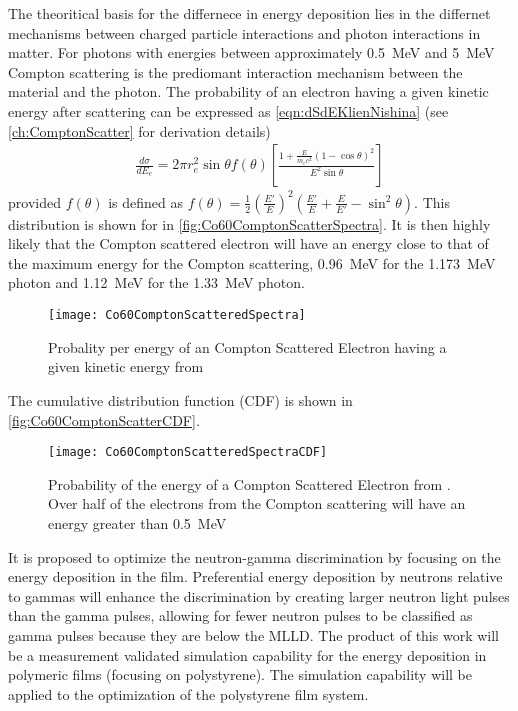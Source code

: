 The theoritical basis for the differnece in energy deposition lies in the differnet mechanisms between charged particle interactions and photon interactions in matter.
For photons with energies between approximately \SI{0.5}{\MeV} and \SI{5}{\MeV} Compton scattering is the prediomant interaction mechanism between the material and the photon.
The probability of an electron having a given kinetic energy after scattering can be expressed as \autoref{eqn:dSdEKlienNishina} (see \autoref{ch:ComptonScatter} for derivation details)
\begin{align}
  \label{eqn:dSdEKleinNishina}
\frac{d\sigma}{dE_e} = 2\pi r_e^2 \sin \theta f(\theta)\left [ \frac{1+\frac{E}{m_e c^2}\left(1-\cos\theta \right)^2}{E^2 \sin \theta} \right ]
\end{align}
provided  $f(\theta)$ is defined as $f(\theta) = \frac{1}{2}\left(\frac{E'}{E}\right)^2 \left(\frac{E'}{E} + \frac{E}{E'}-\sin^2\theta\right)$.
This distribution is shown for  in \autoref{fig:Co60ComptonScatterSpectra}.
It is then highly likely that the Compton scattered electron will have an energy close to that of the maximum energy for the Compton scattering, \SI{0.96}{\MeV} for the \SI{1.173}{\MeV} photon and \SI{1.12}{\MeV} for the \SI{1.33}{\MeV} photon.
\begin{figure}
  \centering
  \texttt{[image: Co60ComptonScatteredSpectra]}
  \caption[ Compton Scattered Spectra]{Probality per energy of an Compton Scattered Electron having a given kinetic energy from }
  \label{fig:Co60ComptonScatterSpectra}
\end{figure}
The cumulative distribution function (CDF) is shown in \autoref{fig:Co60ComptonScatterCDF}.
\begin{figure}
  \centering
  \texttt{[image: Co60ComptonScatteredSpectraCDF]}
  \caption[ Compton Scattered CDF]{Probability of the energy of a Compton Scattered Electron from . Over half of the electrons from the Compton scattering will have an energy greater than \SI{0.5}{\MeV}}
  \label{fig:Co60ComptonScatterCDF}
\end{figure}
It is proposed to optimize the neutron-gamma discrimination by focusing on the energy deposition in the film.
Preferential energy deposition by neutrons relative to gammas will enhance the discrimination by creating larger neutron light pulses than the gamma pulses, allowing for fewer neutron pulses to be classified as gamma pulses because they are below the MLLD.
The product of this work will be a measurement validated simulation capability for the energy deposition in polymeric films (focusing on polystyrene).
The simulation capability will be applied to the optimization of the polystyrene film system.

